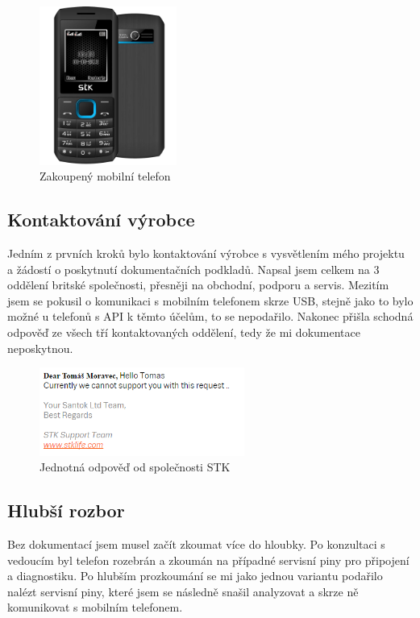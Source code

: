 \documentclass[FM,MP]{tulthesis}  %
\begin{document}
\begin{figure}[H]
\begin{center}
\includegraphics[width=0.4\textwidth]{images/phone.png}
\caption{Zakoupený mobilní telefon}
\label{image}
\end{center}
\end{figure}

\subsection{Kontaktování výrobce}
Jedním z prvních kroků bylo kontaktování výrobce s vysvětlením mého projektu a žádostí o poskytnutí dokumentačních podkladů. Napsal jsem celkem na 3 oddělení britské společnosti, přesněji na obchodní, podporu a servis. Mezitím jsem se pokusil o komunikaci s mobilním telefonem skrze USB, stejně jako to bylo možné u telefonů s API k těmto účelům, to se nepodařilo. Nakonec přišla schodná odpověď ze všech tří kontaktovaných oddělení, tedy že mi dokumentace neposkytnou.

\begin{figure}[H]
\begin{center}
\includegraphics[width=0.6\textwidth]{images/response.png}
\caption{Jednotná odpověď od společnosti STK}
\label{image}
\end{center}
\end{figure}

\subsection{Hlubší rozbor}
Bez dokumentací jsem musel začít zkoumat více do hloubky. Po konzultaci s vedoucím byl telefon rozebrán a zkoumán na případné servisní piny pro připojení a diagnostiku. Po hlubším prozkoumání se mi jako jednou variantu podařilo nalézt servisní piny, které jsem se následně snašil analyzovat a skrze ně komunikovat s mobilním telefonem.
\end{document}
